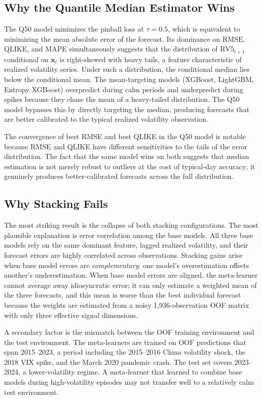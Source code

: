\documentclass[12pt]{article}
\begin{document}
\subsection{Why the Quantile Median Estimator Wins}

The Q50 model minimizes the pinball loss at $\tau = 0.5$, which is equivalent
to minimizing the mean absolute error of the forecast.  Its dominance on
RMSE, QLIKE, and MAPE simultaneously suggests that the distribution of
$\text{RV5}_{t+1}$ conditional on $\mathbf{x}_{t}$ is right-skewed with
heavy tails, a feature characteristic of realized volatility series.  Under
such a distribution, the conditional median lies below the conditional mean.
The mean-targeting models (XGBoost, LightGBM, Entropy XGBoost) overpredict
during calm periods and underpredict during spikes because they chase the
mean of a heavy-tailed distribution.  The Q50 model bypasses this by directly
targeting the median, producing forecasts that are better calibrated to the
typical realized volatility observation.

The convergence of best RMSE and best QLIKE in the Q50 model is notable
because RMSE and QLIKE have different sensitivities to the tails of the error
distribution.  The fact that the same model wins on both suggests that median
estimation is not merely robust to outliers at the cost of typical-day
accuracy; it genuinely produces better-calibrated forecasts across the full
distribution.

\subsection{Why Stacking Fails}

The most striking result is the collapse of both stacking configurations.
The most plausible explanation is error correlation among the base models.
All three base models rely on the same dominant feature, lagged realized
volatility, and their forecast errors are highly correlated across
observations.  Stacking gains arise when base model errors are
\emph{complementary}: one model's overestimation offsets another's
underestimation.  When base model errors are aligned, the meta-learner cannot
average away idiosyncratic error; it can only estimate a weighted mean of the
three forecasts, and this mean is worse than the best individual forecast
because the weights are estimated from a noisy 1,936-observation OOF matrix
with only three effective signal dimensions.

A secondary factor is the mismatch between the OOF training environment and
the test environment.  The meta-learners are trained on OOF predictions that
span 2015--2023, a period including the 2015--2016 China volatility shock,
the 2018 VIX spike, and the March 2020 pandemic crash.  The test set covers
2023--2024, a lower-volatility regime.  A meta-learner that learned to combine
base models during high-volatility episodes may not transfer well to a
relatively calm test environment.
\end{document}
